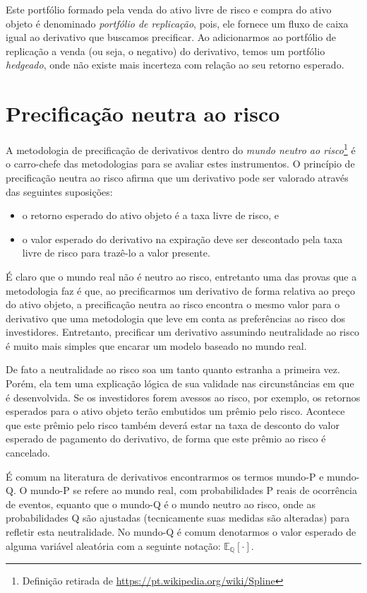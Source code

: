 \documentclass[]{book}
\providecommand{\tightlist}{%
  \setlength{\itemsep}{0pt}\setlength{\parskip}{0pt}}
\let\rmarkdownfootnote\footnote%
\def\footnote{\protect\rmarkdownfootnote}
\begin{document}
Este portfólio formado pela venda do ativo livre de risco e compra do
ativo objeto é denominado \emph{portfólio de replicação}, pois, ele
fornece um fluxo de caixa igual ao derivativo que buscamos precificar.
Ao adicionarmos ao portfólio de replicação a venda (ou seja, o negativo)
do derivativo, temos um portfólio \emph{hedgeado}, onde não existe mais
incerteza com relação ao seu retorno esperado.

\section{Precificação neutra ao
risco}\label{precificacao-neutra-ao-risco}

A metodologia de precificação de derivativos dentro do \emph{mundo
neutro ao risco}\footnote{Definição retirada de
  \url{https://pt.wikipedia.org/wiki/Spline}} é o carro-chefe das
metodologias para se avaliar estes instrumentos. O princípio de
precificação neutra ao risco afirma que um derivativo pode ser valorado
através das seguintes suposições:

\begin{itemize}
\tightlist
\item
  o retorno esperado do ativo objeto é a taxa livre de risco, e
\item
  o valor esperado do derivativo na expiração deve ser descontado pela
  taxa livre de risco para trazê-lo a valor presente.
\end{itemize}

É claro que o mundo real não é neutro ao risco, entretanto uma das
provas que a metodologia faz é que, ao precificarmos um derivativo de
forma relativa ao preço do ativo objeto, a precificação neutra ao risco
encontra o mesmo valor para o derivativo que uma metodologia que leve em
conta as preferências ao risco dos investidores. Entretanto, precificar
um derivativo assumindo neutralidade ao risco é muito mais simples que
encarar um modelo baseado no mundo real.

De fato a neutralidade ao risco soa um tanto quanto estranha a primeira
vez. Porém, ela tem uma explicação lógica de sua validade nas
circunstâncias em que é desenvolvida. Se os investidores forem avessos
ao risco, por exemplo, os retornos esperados para o ativo objeto terão
embutidos um prêmio pelo risco. Acontece que este prêmio pelo risco
também deverá estar na taxa de desconto do valor esperado de pagamento
do derivativo, de forma que este prêmio ao risco é cancelado.

É comum na literatura de derivativos encontrarmos os termos mundo-P e
mundo-Q. O mundo-P se refere ao mundo real, com probabilidades P reais
de ocorrência de eventos, equanto que o mundo-Q é o mundo neutro ao
risco, onde as probabilidades Q são ajustadas (tecnicamente suas medidas
são alteradas) para refletir esta neutralidade. No mundo-Q é comum
denotarmos o valor esperado de alguma variável aleatória com a seguinte
notação: \(\mathbb{E_Q}[\cdot]\).
\end{document}
